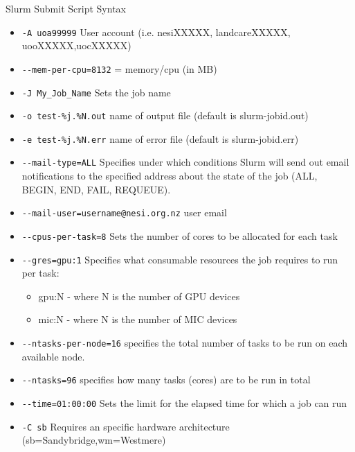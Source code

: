 \documentclass[final,t]{beamer}
\begin{document}
\begin{frame}[fragile]{}
\begin{columns}[t]
\begin{column}{.35\linewidth}
      \begin{block}{Slurm Submit Script Syntax}
        \begin{itemize}
        \item \verb|-A uoa99999| User account (i.e. nesiXXXXX, landcareXXXXX, uooXXXXX,uocXXXXX)
        \item \verb|--mem-per-cpu=8132| = memory/cpu (in MB)
        \item \verb|-J My_Job_Name| Sets the job name
        \item \verb|-o test-%j.%N.out| name of output file (default is slurm-jobid.out)
        \item \verb|-e test-%j.%N.err| name of error file (default is slurm-jobid.err)
        \item \verb|--mail-type=ALL| Specifies under which conditions Slurm will send out email notifications to the specified address about the state of the job (ALL, BEGIN, END, FAIL, REQUEUE).
        \item \verb|--mail-user=username@nesi.org.nz| user email
        \item \verb|--cpus-per-task=8| Sets the number of cores to be allocated for each task
        \item \verb|--gres=gpu:1| Specifies what consumable resources the job requires to run per task:
        \begin{itemize}
            \item gpu:N - where N is the number of GPU devices
            \item mic:N - where N is the number of MIC devices
        \end{itemize}
        \item \verb|--ntasks-per-node=16| specifies the total number of tasks to be run on each available node.
        \item \verb|--ntasks=96| specifies how many tasks (cores) are to be run in total
        \item \verb|--time=01:00:00| Sets the limit for the elapsed time for which a job can run
        \item \verb|-C sb| Requires an specific hardware architecture (sb=Sandybridge,wm=Westmere)
        \end{itemize}
      \end{block}


\end{column}
\end{columns}
\end{frame}
\end{document}
